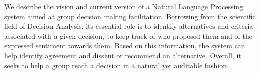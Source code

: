 We describe the vision and current version of a Natural Language Processing system aimed at group decision making facilitation. Borrowing from the scientific field of Decision Analysis, its essential role is to identify alternatives and criteria associated with a given decision, to keep track of who proposed them and of the expressed sentiment towards them. Based on this information, the system can help identify agreement and dissent or recommend an alternative. Overall, it seeks to help a group reach a decision in a natural yet auditable fashion.

